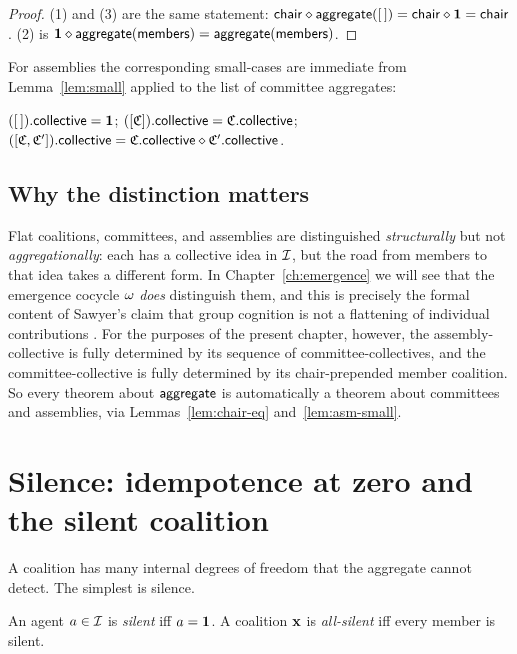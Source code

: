 \begin{proof}
(1) and (3) are the same statement: $\mathsf{chair} \mathbin{\diamond} \mathsf{aggregate}([\,])
= \mathsf{chair} \mathbin{\diamond} \mathbf{1} = \mathsf{chair}$. (2) is $\mathbf{1} \mathbin{\diamond}
\mathsf{aggregate}(\mathsf{members}) = \mathsf{aggregate}(\mathsf{members})$.
\end{proof}

For assemblies the corresponding small-cases are immediate from
Lemma~\ref{lem:small} applied to the list of committee aggregates:

\begin{lemma}\label{lem:asm-small}
$([\,]).\mathsf{collective} = \mathbf{1}$; $([\mathfrak{C}]).\mathsf{collective} =
\mathfrak{C}.\mathsf{collective}$; $([\mathfrak{C}, \mathfrak{C}']).\mathsf{collective} = \mathfrak{C}.\mathsf{collective}
\mathbin{\diamond} \mathfrak{C}'.\mathsf{collective}$.
\end{lemma}

\subsection*{Why the distinction matters}

Flat coalitions, committees, and assemblies are distinguished
\emph{structurally} but not \emph{aggregationally}: each has a
collective idea in $\mathcal{I}$, but the road from members to that idea
takes a different form. In Chapter~\ref{ch:emergence} we will see
that the emergence cocycle $\omega$ \emph{does} distinguish them, and
this is precisely the formal content of Sawyer's claim that group
cognition is not a flattening of individual contributions
\cite{Sawyer2005, SawyerEmergence2005}. For the purposes of the
present chapter, however, the assembly-collective is fully determined
by its sequence of committee-collectives, and the committee-collective
is fully determined by its chair-prepended member coalition. So every
theorem about $\mathsf{aggregate}$ is automatically a theorem about
committees and assemblies, via Lemmas~\ref{lem:chair-eq}
and~\ref{lem:asm-small}.

\section{Silence: idempotence at zero and the silent coalition}
\label{sec:silence}

A coalition has many internal degrees of freedom that the aggregate
cannot detect. The simplest is silence.

\begin{definition}\label{def:silent}
An agent $a \in \mathcal{I}$ is \emph{silent} iff $a = \mathbf{1}$. A
coalition $\mathbf{x}$ is \emph{all-silent} iff every member is silent.
\end{definition}

